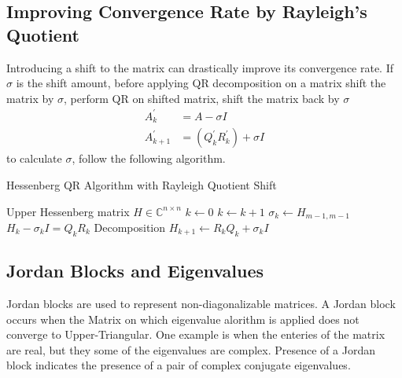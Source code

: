 \documentclass[12pt]{article}
\begin{document}
\subsection{Improving Convergence Rate by Rayleigh's Quotient}
Introducing a shift to the matrix can drastically improve its convergence rate. If $\sigma$ is the shift amount, before applying QR decomposition on a matrix shift the matrix by $\sigma$, perform QR on shifted matrix, shift the matrix back by $\sigma$
\begin{align*}
    A^{\prime}_k &= A-\sigma I\\
    A^{\prime}_{k+1} &= (Q_k^{\prime}R_k^{\prime})+\sigma I
\end{align*}
to calculate $\sigma$, follow the following algorithm.
\begin{algorithm}[H]
\caption{Hessenberg QR Algorithm with Rayleigh Quotient Shift}
\begin{algorithmic}[1]
\REQUIRE Upper Hessenberg matrix $H \in \mathbb{C}^{n \times n}$
\STATE $k \leftarrow 0$
    \STATE $k \leftarrow k + 1$
    \REPEAT
        \STATE $\sigma_k \leftarrow H_{m-1, m-1}$
        \STATE $H_k - \sigma_k I = Q_k R_k$ Decomposition
        \STATE $H_{k+1} \leftarrow R_k Q_k + \sigma_k I$
\ENDFOR
\end{algorithmic}
\end{algorithm}
\subsection{Jordan Blocks and Eigenvalues}

Jordan blocks are used to represent non-diagonalizable matrices. A Jordan block occurs when the Matrix on which eigenvalue alorithm is applied does not converge to Upper-Triangular. One example is when the enteries of the matrix are real, but they some of the eigenvalues are complex. Presence of a Jordan block indicates the presence of a pair of complex conjugate eigenvalues. 
\begin{center}
\end{center}
\end{document}
